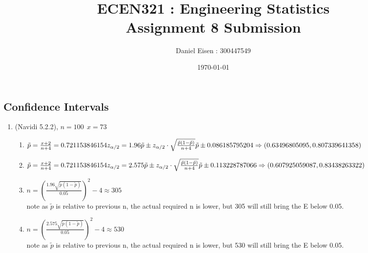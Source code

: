 \documentclass[11pt]{article}
\title{ECEN321 : Engineering Statistics \\ Assignment 8 Submission}
\author{Daniel Eisen : 300447549}
\date{\today}
\begin{document}
\begin{preview}
\maketitle
\section*{Confidence Intervals}
\begin{enumerate}
        \item (Navidi 5.2.2), $n=100 \:\: x=73$ %
        \begin{enumerate}
                \item $\tilde{p} = \frac{x+2}{n+4} = 0.721153846154 \\
                z_{\alpha/2} = 1.96 \\
                \tilde{p} \pm z_{\alpha/2}\cdot\sqrt{\frac{\tilde{p}\left(1-\tilde{p}\right)}{n+4}} \\
                \tilde{p} \pm 0.086185795204 \Rightarrow (0.63496805095, 0.807339641358)$
        
                \item $\tilde{p} = \frac{x+2}{n+4} = 0.721153846154 \\
                z_{\alpha/2} = 2.575 \\
                \tilde{p} \pm z_{\alpha/2}\cdot\sqrt{\frac{\tilde{p}\left(1-\tilde{p}\right)}{n+4}} \\
                \tilde{p} \pm 0.113228787066 \Rightarrow (0.607925059087,0.83438263322)$

                \item $n=\left(\frac{1.96\sqrt{\tilde{p}\left(1-\tilde{p}\right)}}{0.05}\right)^{2}-4 \approx 305$\\ note as $\tilde{p}$ is relative to previous n, the actual required n is lower, but 305 will still bring the E below 0.05.
                
                \item $n=\left(\frac{2.575\sqrt{\tilde{p}\left(1-\tilde{p}\right)}}{0.05}\right)^{2}-4 \approx 530$\\ note as $\tilde{p}$ is relative to previous n, the actual required n is lower, but 530 will still bring the E below 0.05.
                

\end{enumerate}
\end{enumerate}
\end{preview}
\end{document}
